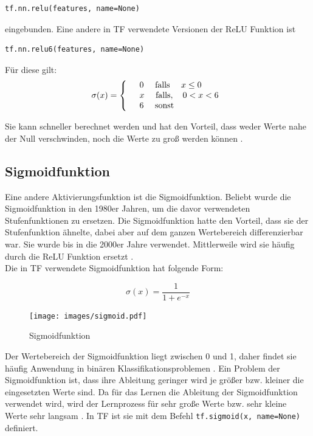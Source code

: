 \vspace{0.3cm}
\begin{lstlisting}
tf.nn.relu(features, name=None)
\end{lstlisting} 

eingebunden. Eine andere in \gls{TF} verwendete Versionen der \gls{ReLU} Funktion ist \cite{cookbook}

\vspace{0.3cm}
\begin{lstlisting}
tf.nn.relu6(features, name=None)
\end{lstlisting}
F\"ur diese gilt:
\begin{align*}
	\sigma(x)=
	\left\{
	\begin{array}{l l}
		& 0 \quad \text{   falls  } \quad x \leq 0  \\ 
		& x \quad \text{   falls},\quad 0 < x < 6 \\
		& 6 \quad \text{   sonst}
	\end{array}
	\right.
\end{align*}

Sie kann schneller berechnet werden und hat den Vorteil, dass weder Werte nahe der Null verschwinden, noch die Werte zu groß werden k\"onnen \cite{cookbook}.


\subsection{Sigmoidfunktion}
Eine andere Aktivierungsfunktion ist die Sigmoidfunktion. Beliebt wurde die Sigmoidfunktion in den 1980er Jahren, um die davor verwendeten Stufenfunktionen zu ersetzen. Die Sigmoidfunktion hatte den Vorteil, dass sie der Stufenfunktion ähnelte, dabei aber auf dem ganzen Wertebereich differenzierbar war. Sie wurde bis in die 2000er Jahre verwendet. Mittlerweile wird sie häufig durch die \gls{ReLU} Funktion ersetzt \cite{Goodfellow}. \\
Die in \gls{TF} verwendete Sigmoidfunktion hat folgende Form: \cite{cookbook}

\begin{equation}
\sigma(x)=\frac{1}{1+e^{-x}}
\end{equation}

\begin{figure}[!htp]
	\centering
	\texttt{[image: images/sigmoid.pdf]}
	\caption{Sigmoidfunktion \cite{building}}
\end{figure}


Der Wertebereich der Sigmoidfunktion liegt zwischen 0 und 1, daher findet sie häufig Anwendung in binären Klassifikationsproblemen \cite{Goodfellow}. Ein Problem der Sigmoidfunktion ist, dass ihre Ableitung geringer wird je größer bzw. kleiner die eingesetzten Werte sind. Da für das Lernen die Ableitung der Sigmoidfunktion verwendet wird, wird der Lernprozess für sehr große Werte bzw. sehr kleine Werte sehr langsam \cite{Goodfellow}. In \gls{TF} ist sie mit dem Befehl \lstinline$tf.sigmoid(x, name=None)$ \cite{building}
definiert.



